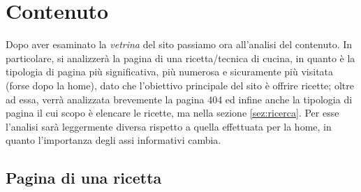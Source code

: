 \section{Contenuto}
Dopo aver esaminato la \textit{vetrina} del sito passiamo ora all'analisi del contenuto. In particolare, si analizzerà la pagina di una ricetta/tecnica di cucina, in quanto è la tipologia di pagina più significativa, più numerosa e sicuramente più visitata (forse dopo la home), dato che l'obiettivo principale del sito è offrire ricette; oltre ad essa, verrà analizzata brevemente la pagina 404 ed infine anche la tipologia di pagina il cui scopo è elencare le ricette, ma nella sezione \ref{sez:ricerca}. Per esse l'analisi sarà leggermente diversa rispetto a quella effettuata per la home, in quanto l'importanza degli assi informativi cambia.

\subsection{Pagina di una ricetta}
